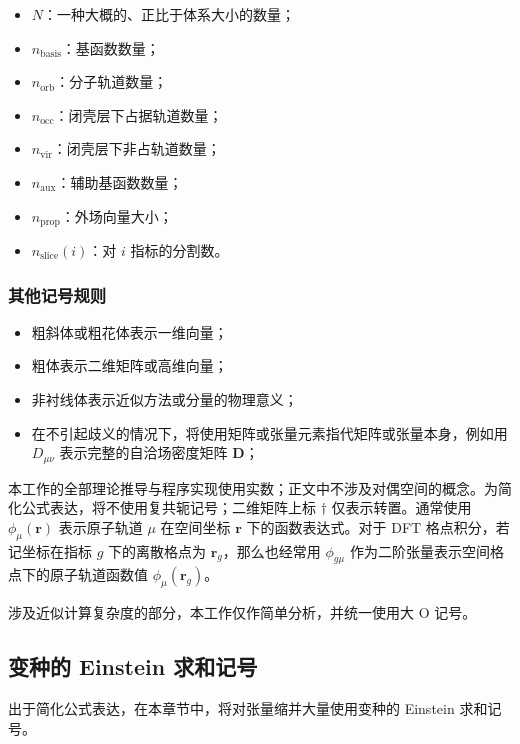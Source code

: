 \begin{itemize}[nosep]
    \item $N$：一种大概的、正比于体系大小的数量；
    \item $n_\mathrm{basis}$：基函数数量；
    \item $n_\mathrm{orb}$：分子轨道数量；
    \item $n_\mathrm{occ}$：闭壳层下占据轨道数量；
    \item $n_\mathrm{vir}$：闭壳层下非占轨道数量；
    \item $n_\mathrm{aux}$：辅助基函数数量；
    \item $n_\mathrm{prop}$：外场向量大小；
    \item $n_\mathrm{slice}(i)$：对 $i$ 指标的分割数。
\end{itemize}

\subsubsection{其他记号规则}

\begin{itemize}[nosep]
    \item 粗斜体或粗花体表示一维向量；
    \item 粗体表示二维矩阵或高维向量；
    \item 非衬线体表示近似方法或分量的物理意义；
    \item 在不引起歧义的情况下，将使用矩阵或张量元素指代矩阵或张量本身，例如用 $D_{\mu \nu}$ 表示完整的自洽场密度矩阵 $\mathbf{D}$；
\end{itemize}

本工作的全部理论推导与程序实现使用实数；正文中不涉及对偶空间的概念。为简化公式表达，将不使用复共轭记号；二维矩阵上标 $\dagger$ 仅表示转置。通常使用 $\phi_\mu (\bm{r})$ 表示原子轨道 $\mu$ 在空间坐标 $\bm{r}$ 下的函数表达式。对于 DFT 格点积分，若记坐标在指标 $g$ 下的离散格点为 $\bm{r}_g$，那么也经常用 $\phi_{g \mu}$ 作为二阶张量表示空间格点下的原子轨道函数值 $\phi_\mu (\bm{r}_g)$。

涉及近似计算复杂度的部分，本工作仅作简单分析，并统一使用大 O 记号。

\subsection{变种的 Einstein 求和记号}
\label{sec.3.einstein}

出于简化公式表达，在本章节中，将对张量缩并大量使用变种的 Einstein 求和记号\cite{Einstein-Einstein.AP.1916}。

